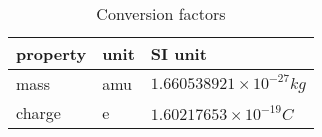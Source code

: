 \documentclass[10pt,conference,onecolumn]{IEEEtran}
\begin{document}
\begin{table}[htbp]
 \centering	  	  
 \caption{Conversion factors}
\label{tab:conversion}
\begin{tabular}{l|l|l}
\hline \hline
\textbf{property} & \textbf{unit} & \textbf{SI unit} \\
\hline
mass & amu & $1.660538921 \times 10^{ - 27} kg$ \\
charge & e   & $1.60217653 \times 10^{ - 19} C$ \\
\hline \hline
\end{tabular}
\end{table}



\end{document}
